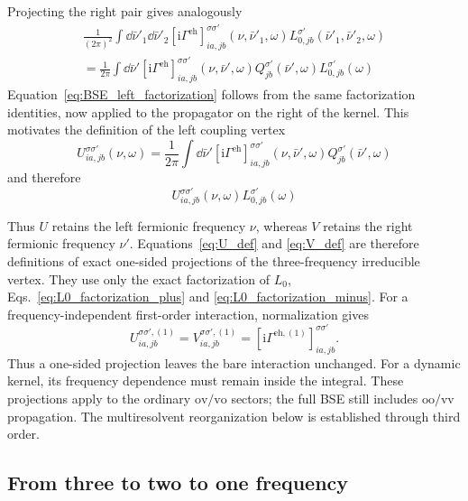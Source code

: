 \documentclass[aip,jcp,reprint,noshowkeys,superscriptaddress]{revtex4-1}
\newcommand{\ii}{\mathrm{i}}
\newcommand{\eh}{\text{eh}}
\begin{document}
Projecting the right pair gives analogously
\begin{multline}
	\frac{1}{(2\pi)^2}
	\int \dd{\bar\nu'_1}\dd{\bar\nu'_2}
	\left[
	\ii\Gamma^\eh
	\right]^{\sigma\sigma'}_{ia,jb}(\nu,\bar\nu'_1,\omega)
	L_{0,jb}^{\sigma'}(\bar\nu'_1,\bar\nu'_2,\omega)
	\\
	=
	\frac{1}{2\pi}
	\int \dd{\bar\nu'}
	\left[
	\ii\Gamma^\eh
	\right]^{\sigma\sigma'}_{ia,jb}(\nu,\bar\nu',\omega)
	Q^{\sigma'}_{jb}(\bar\nu',\omega)
	L_{0,jb}^{\sigma'}(\omega)
	\label{eq:BSE_left_factorization}
\end{multline}
Equation~\eqref{eq:BSE_left_factorization} follows from the same
factorization identities, now applied to the propagator on the right of the
kernel.
This motivates the definition of the left coupling vertex
\begin{equation}
	U^{\sigma\sigma'}_{ia,jb}(\nu,\omega)
	=
	\frac{1}{2\pi}
	\int \dd{\bar\nu'}
	\left[
	\ii\Gamma^\eh
	\right]^{\sigma\sigma'}_{ia,jb}(\nu,\bar\nu',\omega)
	Q^{\sigma'}_{jb}(\bar\nu',\omega)
	\label{eq:U_def}
\end{equation}
and therefore
\begin{equation}
	U^{\sigma\sigma'}_{ia,jb}(\nu,\omega)
	L_{0,jb}^{\sigma'}(\omega)
	\label{eq:BSE_left_compact}
\end{equation}

Thus $U$ retains the left fermionic frequency $\nu$, whereas $V$ retains the
right fermionic frequency $\nu'$.
Equations~\eqref{eq:U_def} and \eqref{eq:V_def} are therefore definitions
of exact one-sided projections of the three-frequency irreducible vertex.
They use only the exact factorization of $L_0$,
Eqs.~\eqref{eq:L0_factorization_plus} and
\eqref{eq:L0_factorization_minus}.
For a frequency-independent first-order interaction, normalization gives
\begin{equation}
    U^{\sigma\sigma',(1)}_{ia,jb}
    =V^{\sigma\sigma',(1)}_{ia,jb}
    =[\ii\Gamma^{\eh,(1)}]^{\sigma\sigma'}_{ia,jb}.
    \label{eq:bare_projection_normalization}
\end{equation}
Thus a one-sided projection leaves the bare interaction unchanged.
For a dynamic kernel, its frequency dependence must remain inside the
integral. These projections apply to the ordinary $\text{ov}/\text{vo}$
sectors; the full BSE still includes $\text{oo}/\text{vv}$ propagation.
The multiresolvent reorganization below is established through third order.

\subsection{From three to two to one frequency}
\end{document}
